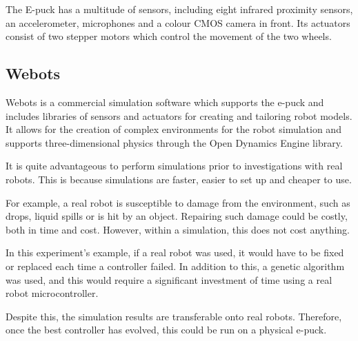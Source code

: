 The E-puck has a multitude of sensors, including eight infrared proximity sensors, an accelerometer, microphones and a colour CMOS camera in front. Its actuators consist of two stepper motors which control the movement of the two wheels.


\subsection{Webots}

Webots is a commercial simulation software which supports the e-puck and includes libraries of sensors and actuators for creating and tailoring robot models. It allows for the creation of complex environments for the robot simulation and supports three-dimensional physics through the Open Dynamics Engine library.
 
It is quite advantageous to perform simulations prior to investigations with real robots. This is because simulations are faster, easier to set up and cheaper to use.

For example, a real robot is susceptible to damage from the environment, such as drops, liquid spills or is hit by an object. Repairing such damage could be costly, both in time and cost. However, within a simulation, this does not cost anything.

In this experiment's example, if a real robot was used, it would have to be fixed or replaced each time a controller failed. In addition to this, a genetic algorithm was used, and this would require a significant investment of time using a real robot microcontroller. \cite{Michel2004}

Despite this, the simulation results are transferable onto real robots. Therefore, once the best controller has evolved, this could be run on a physical e-puck.

